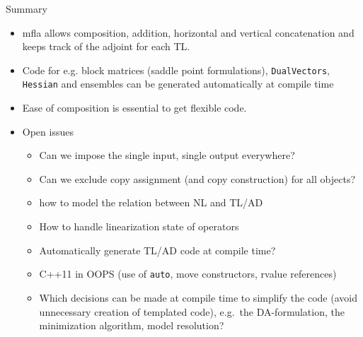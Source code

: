 \documentclass[9pt]{beamer}
\begin{document}
\begin{frame}{Summary}
  \begin{itemize}
    \item mfla allows composition, addition, horizontal and vertical concatenation and keeps track of the adjoint for each TL.
    \item Code for e.g. block matrices (saddle point formulations), \lstinline|DualVectors|, \lstinline|Hessian| and ensembles can be generated automatically at compile time
    \item Ease of composition is essential to get flexible code.
    \pause
  \item Open issues
    \begin{itemize}
      \item Can we impose the single input, single output everywhere? 
      \item Can we exclude copy assignment (and copy construction) for all objects?
     \item how to model the relation between NL and TL/AD 
     \item How to handle linearization state of operators
     \item Automatically generate TL/AD code at compile time?
    \item C++11 in OOPS (use of \lstinline|auto|,  move constructors, rvalue references)
    \item Which decisions can be made at compile time to simplify the code (avoid unnecessary creation of templated code), e.g.\ the DA-formulation, the minimization algorithm, model resolution?
  \end{itemize}
  \end{itemize}
\end{frame}


\end{document}
